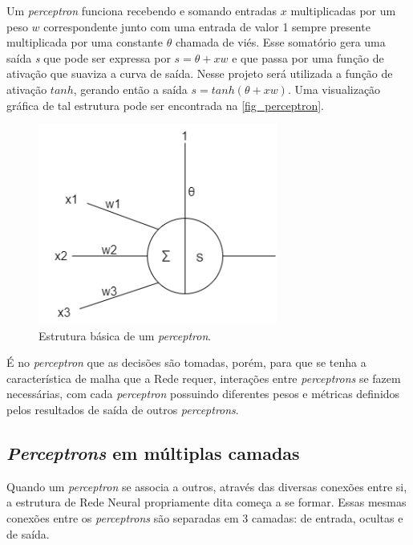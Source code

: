 Um \textit{perceptron} funciona recebendo e somando entradas \(x\) multiplicadas por 
um peso \(w\) correspondente junto com uma entrada de valor 1 sempre presente 
multiplicada por uma constante \(\theta\) chamada de viés. Esse somatório gera uma saída 
\textit{s} que pode ser expressa por \(s = \theta + xw\) e que passa por uma função de ativação 
que suaviza a curva de saída. Nesse projeto será utilizada a função de ativação 
\(tanh\), gerando então a saída \(s = tanh( \theta + xw)\). Uma visualização gráfica de tal 
estrutura pode ser encontrada na \autoref{fig_perceptron}.

\begin{figure}[htb]
        \centering
        \caption{\label{fig_perceptron}Estrutura b{\'a}sica de um \textit{perceptron}.}
        \includegraphics[width=0.7\textwidth]{images/Perceptron.png}
\end{figure}

{\'E} no \textit{perceptron} que as decisões são tomadas, porém, para que se tenha a 
característica de malha que a Rede requer, interações entre \textit{perceptrons} se fazem 
necessárias, com cada \textit{perceptron} possuindo diferentes pesos e métricas definidos 
pelos resultados de saída de outros \textit{perceptrons}.

\subsection{\textit{Perceptrons} em m{\'u}ltiplas camadas}

Quando um \textit{perceptron} se associa a outros, através das diversas conexões 
entre si, a estrutura de Rede Neural propriamente dita começa a se formar. Essas 
mesmas conexões entre os \textit{perceptrons} são separadas em 3 camadas: de entrada, 
ocultas e de saída.

